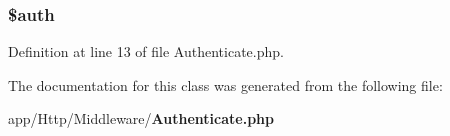\subsubsection[{\$auth}]{\setlength{\rightskip}{0pt plus 5cm}\$auth\hspace{0.3cm}{\ttfamily [protected]}}\label{class_app_1_1_http_1_1_middleware_1_1_authenticate_a20d7415a9c3391b32d7fe2136fce6e2c}


Definition at line 13 of file Authenticate.\+php.



The documentation for this class was generated from the following file\+:\begin{DoxyCompactItemize}
\item 
app/\+Http/\+Middleware/{\bf Authenticate.\+php}\end{DoxyCompactItemize}
